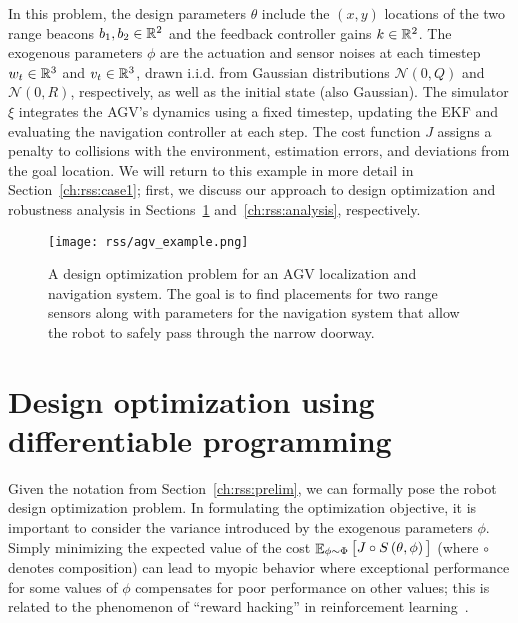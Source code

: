 In this problem, the design parameters $\theta$ include the $(x, y)$ locations of the two range beacons $b_1, b_2 \in \mathbb{R}^2$ and the feedback controller gains $k \in \mathbb{R}^2$. The exogenous parameters $\phi$ are the actuation and sensor noises at each timestep $w_t \in \mathbb{R}^3$ and $v_t \in \mathbb{R}^3$, drawn i.i.d. from Gaussian distributions $\mathcal{N}(0, Q)$ and $\mathcal{N}(0, R)$, respectively, as well as the initial state (also Gaussian). The simulator $\xi$ integrates the AGV's dynamics using a fixed timestep, updating the EKF and evaluating the navigation controller at each step. The cost function $J$ assigns a penalty to collisions with the environment, estimation errors, and deviations from the goal location. We will return to this example in more detail in Section~\ref{ch:rss:case1}; first, we discuss our approach to design optimization and robustness analysis in Sections~\ref{ch:rss:optimization} and~\ref{ch:rss:analysis}, respectively.

\begin{figure}[tb]
	\centering
	\texttt{[image: rss/agv\_example.png]}
	\caption{A design optimization problem for an AGV localization and navigation system. The goal is to find placements for two range sensors along with parameters for the navigation system that allow the robot to safely pass through the narrow doorway.}
	\label{ch:rss:fig:agv_example}
\end{figure}

\section{Design optimization using differentiable programming}\label{ch:rss:optimization}

Given the notation from Section~\ref{ch:rss:prelim}, we can formally pose the robot design optimization problem. In formulating the optimization objective, it is important to consider the variance introduced by the exogenous parameters $\phi$. Simply minimizing the expected value of the cost $\mathop{\mathbb{E}}_{\phi \sim \Phi} \big[ J\circ S\left( \theta, \phi \right) \big]$ (where $\circ$ denotes composition) can lead to myopic behavior where exceptional performance for some values of $\phi$ compensates for poor performance on other values; this is related to the phenomenon of ``reward hacking'' in reinforcement learning~\cite{amodei2016_ai_safety}.

